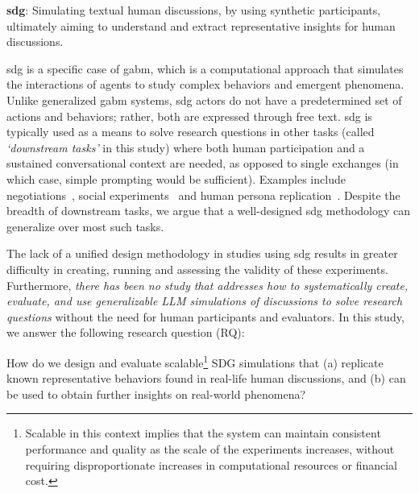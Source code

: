 \begin{definition}
	\textbf{\acf{sdg}}: Simulating textual human discussions, by using synthetic participants, ultimately aiming to understand and extract representative insights for human discussions.
\end{definition}

\ac{sdg} is a specific case of \acf{gabm}, which is a computational approach that simulates the interactions of agents to study complex behaviors and emergent phenomena. Unlike generalized \ac{gabm} systems, \ac{sdg} actors do not have a predetermined set of actions and behaviors; rather, both are expressed through free text. \ac{sdg} is typically used as a means to solve research questions in other tasks (called \emph{`downstream tasks'} in this study) where both human participation and a sustained conversational context are needed, as opposed to single exchanges (in which case, simple prompting would be sufficient). Examples include negotiations~\cite{abdelnabi_negotiations}, social experiments~\cite{park_simulacra} and human persona replication~\cite{park2024generativeagentsimulations1000}. Despite the breadth of downstream tasks, we argue that a well-designed \ac{sdg} methodology can generalize over most such tasks.

The lack of a unified design methodology in studies using \ac{sdg} results in greater difficulty in creating, running and assessing the validity of these experiments. Furthermore, \emph{there has been no study that addresses how to systematically create, evaluate, and use generalizable LLM simulations of discussions to solve research questions} without the need for human participants and evaluators. In this study, we answer the following research question (RQ):

\begin{research-question}
	How do we design and evaluate scalable\footnote{Scalable in this context implies that the system can maintain consistent performance and quality as the scale of the experiments increases, without requiring disproportionate increases in computational resources or financial cost.} SDG simulations that (a) replicate known representative behaviors found in real-life human discussions, and (b) can be used to obtain further insights on real-world phenomena?
\end{research-question}

